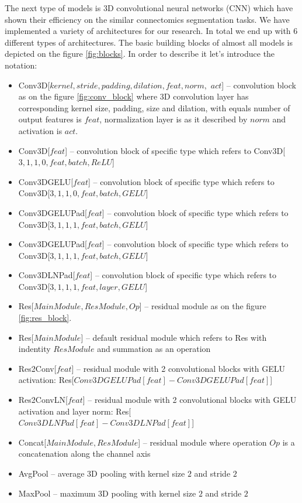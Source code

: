 \documentclass[twocolumn, a4paper]{article}
\theoremstyle{definition}
\begin{document}
The next type of models is 3D convolutional neural networks (CNN) which have shown their efficiency
on the similar connectomics segmentation tasks. We have implemented a variety of architectures for our
research. In total we end up with 6 different types of architectures.
The basic building blocks of almost all models is depicted on the figure \ref{fig:blocks}.
In order to describe it let's introduce the notation:
\begin{itemize}
    \itemsep0em
    \item Conv3D[\( kernel, stride, padding, dilation, feat, norm, \) \( act\)] -- convolution block as on the figure \ref{fig:conv_block}
          where 3D convolution layer has corresponding kernel size, padding, size and dilation, with  equals
          number of output features is \( feat \), normalization layer is
          as it described by \( norm \) and activation is \( act \).
    \item Conv3D[\( feat \)] -- convolution block of specific type which refers to
          Conv3D[\( 3, 1, 1, 0, feat, batch, ReLU \)]
    \item Conv3DGELU[\( feat \)] -- convolution block of specific type which refers to
          Conv3D[\( 3, 1, 1, 0, feat, batch, GELU \)]
    \item Conv3DGELUPad[\( feat \)] -- convolution block of specific type which refers to
          Conv3D[\( 3, 1, 1, 1, feat, batch, GELU \)]
    \item Conv3DGELUPad[\( feat \)] -- convolution block of specific type which refers to
          Conv3D[\( 3, 1, 1, 1, feat, batch, GELU \)]
    \item Conv3DLNPad[\( feat \)] -- convolution block of specific type which refers to
          Conv3D[\( 3, 1, 1, 1, feat, layer, GELU \)]
    \item Res[\( MainModule, ResModule, Op \)] -- residual module as on the figure \ref{fig:res_block}.
    \item Res[\( MainModule \)] -- default residual module which refers to Res with indentity \( ResModule \) and
          summation as an operation
    \item Res2Conv[\( feat \)] -- residual module with 2 convolutional blocks with GELU activation:
          Res[\( Conv3DGELUPad[feat] - Conv3DGELUPad[feat] \)]
    \item Res2ConvLN[\( feat \)] -- residual module with 2 convolutional blocks with GELU activation and layer norm:
          Res[\( Conv3DLNPad[feat] - Conv3DLNPad[feat] \)]
    \item Concat[\( MainModule, ResModule\)] -- residual module where operation \( Op \) is a concatenation along the channel axis
    \item AvgPool -- average 3D pooling with kernel size \( 2 \) and stride \( 2 \)
    \item MaxPool -- maximum 3D pooling with kernel size \( 2 \) and stride \( 2 \)
\end{itemize}
\end{document}
